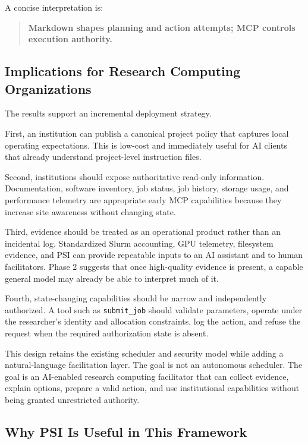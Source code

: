 \documentclass[11pt]{article}
\begin{document}
A concise interpretation is:

\begin{quote}
\textbf{Markdown shapes planning and action attempts; MCP controls execution authority.}
\end{quote}

\subsection{Implications for Research Computing Organizations}

The results support an incremental deployment strategy.

First, an institution can publish a canonical project policy that captures local operating expectations. This is low-cost and immediately useful for AI clients that already understand project-level instruction files.

Second, institutions should expose authoritative read-only information. Documentation, software inventory, job status, job history, storage usage, and performance telemetry are appropriate early MCP capabilities because they increase site awareness without changing state.

Third, evidence should be treated as an operational product rather than an incidental log. Standardized Slurm accounting, GPU telemetry, filesystem evidence, and PSI can provide repeatable inputs to an AI assistant and to human facilitators. Phase 2 suggests that once high-quality evidence is present, a capable general model may already be able to interpret much of it.

Fourth, state-changing capabilities should be narrow and independently authorized. A tool such as \texttt{submit\_job} should validate parameters, operate under the researcher's identity and allocation constraints, log the action, and refuse the request when the required authorization state is absent.

This design retains the existing scheduler and security model while adding a natural-language facilitation layer. The goal is not an autonomous scheduler. The goal is an AI-enabled research computing facilitator that can collect evidence, explain options, prepare a valid action, and use institutional capabilities without being granted unrestricted authority.

\subsection{Why PSI Is Useful in This Framework}
\end{document}
